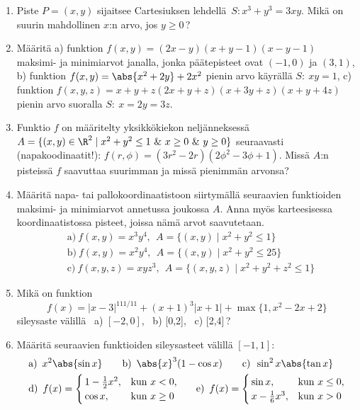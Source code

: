 \begin{enumerate}
\item
Piste $P=(x,y)$ sijaitsee Cartesiuksen lehdellä $\,S: x^3+y^3=3xy$. Mikä on suurin mahdollinen
$x$:n arvo, jos $y \ge 0$\,?

\item 
Määritä \vspace{1mm}\newline
a) funktion $f(x,y)=(2x-y)(x+y-1)(x-y-1)$ maksimi- ja minimiarvot janalla, jonka päätepisteet
ovat $(-1,0)$ ja $(3,1)$, \vspace{1mm}\newline
b) funktion $f(x,y)=\abs{x^2+2y}+2x^2$ pienin arvo käyrällä $S:\ xy=1$, \vspace{1mm}\newline
c) funktion $f(x,y,z)=x+y+z(2x+y+z)(x+3y+z)(x+y+4z)$ pienin arvo suoralla $S:\ x=2y=3z$.

\item
Funktio $f$ on määritelty yksikkökiekon neljänneksessä 
$A=\{(x,y)\in\R^2 \mid x^2+y^2 \le 1\ \&\ x \ge 0\ \&\ y \ge 0\}$ seuraavasti
(napakoodinaatit!): $f(r,\phi)=(3r^2-2r)(2\phi^2-3\phi +1)$. Missä $A$:n pisteissä $f$ 
saavuttaa suurimman ja missä pienimmän arvonsa?

\item
Määritä napa- tai pallokoordinaatistoon siirtymällä seuraavien funktioiden maksimi- ja 
minimiarvot annetussa joukossa $A$. Anna myös karteesisessa koordinaatistossa pisteet, 
joissa nämä arvot saavutetaan.
\begin{align*}
&\text{a)}\ f(x,y)=x^3y^4,\ \ A=\{(x,y) \mid x^2+y^2 \le 1\} \\
&\text{b)}\ f(x,y)=x^2y^4,\ \ A=\{(x,y) \mid x^2+y^2 \le 25\} \\
&\text{c)}\ f(x,y,z)=xyz^3,\ \ A=\{(x,y,z) \mid x^2+y^2+z^2 \le 1\}
\end{align*}

\item
Mikä on funktion 
\[
f(x)=|x-3|^{111/11} + (x+1)^3|x+1| +\max\{1,x^2-2x+2\}
\]
sileysaste välillä \ a) $[-2,0]$, \ b) [0,2], \ c) [2,4]\,?

\item
Määritä seuraavien funktioiden sileysasteet välillä $[-1,1]$:
\begin{align*}
&\text{a)}\,\ x^2\abs{\sin x} \qquad
 \text{b)}\,\ \abs{x}^3(1-\cos x) \qquad
 \text{c)}\,\ \sin^2 x\abs{\tan x} \\
&\text{d)}\,\ f(x) = \begin{cases} 
                     \,1-\tfrac{1}{2}x^2, &\text{kun}\ x<0, \\
                     \,\cos x,            &\text{kun}\ x \ge 0
                     \end{cases} \quad\ \
 \text{e)}\,\ f(x) = \begin{cases}
                     \,\sin x,            &\text{kun}\ x \le 0, \\
                     \,x-\tfrac{1}{6}x^3, &\text{kun}\ x>0
                     \end{cases}
\end{align*} 


\end{enumerate}
